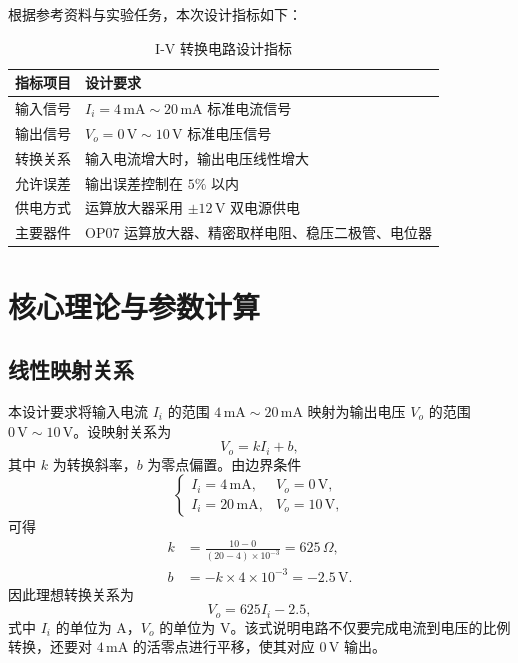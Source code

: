 \documentclass[UTF8,a4paper,zihao=-4]{ctexart}
\begin{document}
根据参考资料与实验任务，本次设计指标如下：
\begin{table}[H]
  \centering
  \caption{I-V 转换电路设计指标}
  \label{tab:design-index}
  \begin{tabular}{>{\centering\arraybackslash}p{4cm} >{\centering\arraybackslash}p{7cm}}
    \toprule
    指标项目 & 设计要求 \\
    \midrule
    输入信号 & $I_i=4\,\mathrm{mA}\sim20\,\mathrm{mA}$ 标准电流信号 \\
    输出信号 & $V_o=0\,\mathrm{V}\sim10\,\mathrm{V}$ 标准电压信号 \\
    转换关系 & 输入电流增大时，输出电压线性增大 \\
    允许误差 & 输出误差控制在 $5\%$ 以内 \\
    供电方式 & 运算放大器采用 $\pm12\,\mathrm{V}$ 双电源供电 \\
    主要器件 & OP07 运算放大器、精密取样电阻、稳压二极管、电位器 \\
    \bottomrule
  \end{tabular}
\end{table}

\section{核心理论与参数计算}

\subsection{线性映射关系}

本设计要求将输入电流 $I_i$ 的范围 $4\,\mathrm{mA}\sim20\,\mathrm{mA}$ 映射为输出电压 $V_o$ 的范围 $0\,\mathrm{V}\sim10\,\mathrm{V}$。设映射关系为
\begin{equation}
  V_o = k I_i + b ,
  \label{eq:linear-map}
\end{equation}
其中 $k$ 为转换斜率，$b$ 为零点偏置。由边界条件
\begin{equation}
  \begin{cases}
    I_i=4\,\mathrm{mA}, & V_o=0\,\mathrm{V},\\
    I_i=20\,\mathrm{mA}, & V_o=10\,\mathrm{V},
  \end{cases}
\end{equation}
可得
\begin{align}
  k &= \frac{10-0}{(20-4)\times10^{-3}}
     = 625\,\Omega, \\
  b &= -k \times 4\times10^{-3}
     = -2.5\,\mathrm{V}.
\end{align}
因此理想转换关系为
\begin{equation}
  V_o = 625 I_i - 2.5 ,
  \label{eq:ideal-transfer}
\end{equation}
式中 $I_i$ 的单位为 $\mathrm{A}$，$V_o$ 的单位为 $\mathrm{V}$。该式说明电路不仅要完成电流到电压的比例转换，还要对 $4\,\mathrm{mA}$ 的活零点进行平移，使其对应 $0\,\mathrm{V}$ 输出。
\end{document}
